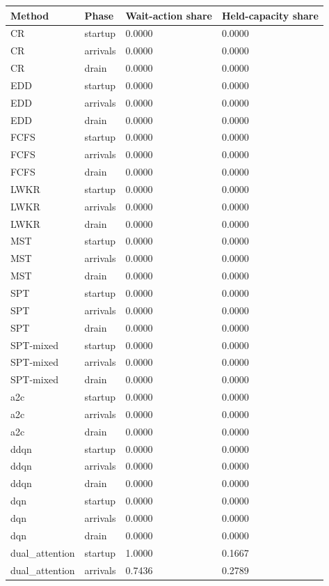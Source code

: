 \begin{tabular}{llll}
\toprule
Method & Phase & Wait-action share & Held-capacity share\\
\midrule
CR & startup & 0.0000 & 0.0000\\
CR & arrivals & 0.0000 & 0.0000\\
CR & drain & 0.0000 & 0.0000\\
EDD & startup & 0.0000 & 0.0000\\
EDD & arrivals & 0.0000 & 0.0000\\
EDD & drain & 0.0000 & 0.0000\\
FCFS & startup & 0.0000 & 0.0000\\
FCFS & arrivals & 0.0000 & 0.0000\\
FCFS & drain & 0.0000 & 0.0000\\
LWKR & startup & 0.0000 & 0.0000\\
LWKR & arrivals & 0.0000 & 0.0000\\
LWKR & drain & 0.0000 & 0.0000\\
MST & startup & 0.0000 & 0.0000\\
MST & arrivals & 0.0000 & 0.0000\\
MST & drain & 0.0000 & 0.0000\\
SPT & startup & 0.0000 & 0.0000\\
SPT & arrivals & 0.0000 & 0.0000\\
SPT & drain & 0.0000 & 0.0000\\
SPT-mixed & startup & 0.0000 & 0.0000\\
SPT-mixed & arrivals & 0.0000 & 0.0000\\
SPT-mixed & drain & 0.0000 & 0.0000\\
a2c & startup & 0.0000 & 0.0000\\
a2c & arrivals & 0.0000 & 0.0000\\
a2c & drain & 0.0000 & 0.0000\\
ddqn & startup & 0.0000 & 0.0000\\
ddqn & arrivals & 0.0000 & 0.0000\\
ddqn & drain & 0.0000 & 0.0000\\
dqn & startup & 0.0000 & 0.0000\\
dqn & arrivals & 0.0000 & 0.0000\\
dqn & drain & 0.0000 & 0.0000\\
dual\_attention & startup & 1.0000 & 0.1667\\
dual\_attention & arrivals & 0.7436 & 0.2789\\

\end{tabular}
